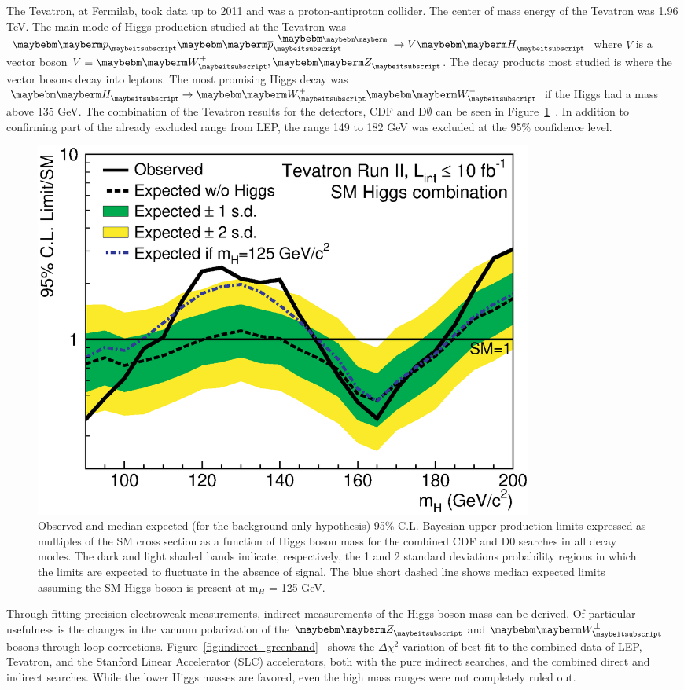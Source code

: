 The Tevatron, at Fermilab, took data up to 2011 and was a proton-antiproton collider.  The center of mass energy of the Tevatron was 1.96 TeV.  The main mode of Higgs production studied at the Tevatron was $\Pp\Pap \rightarrow V\PH$ where $V$ is a vector boson $V\equiv \PWpm,\PZ$.  The decay products most studied is where the vector bosons decay into leptons.  The most promising Higgs decay was $\PH \rightarrow \PWp\PWm$ if the Higgs had a mass above 135 GeV.  The combination of the Tevatron results for the detectors, CDF and D$\emptyset$ can be seen in Figure~\ref{fig:comboRatio}~\cite{CDFandD0:2011aa}. In addition to confirming part of the already excluded range from LEP, the range 149 to 182 GeV was excluded at the 95\% confidence level.

\begin{figure}[htb]
\centering
\includegraphics[width=0.8\textwidth]{StandardModel/tevsmlimits_feb2013.eps}
\caption{\small
Observed and median expected (for the background-only hypothesis) 95\% C.L. Bayesian upper production limits expressed as multiples of the SM cross section as a function of Higgs boson mass for the combined CDF and D0 searches in all decay modes. The dark and light shaded bands indicate, respectively, the 1 and 2 standard deviations probability regions in which the limits are expected to fluctuate in the absence of signal. The blue short dashed line shows median expected limits assuming the SM Higgs boson is present at m$_H$ = 125 GeV.~\cite{CDFandD0:2011aa}
}
\label{fig:comboRatio}
\end{figure}


Through fitting precision electroweak measurements, indirect measurements of the Higgs boson mass can be derived. Of particular usefulness is the changes in the vacuum polarization of the $\PZ$ and $\PWpm$ bosons through loop corrections. Figure~\ref{fig:indirect_greenband}~\cite{Flacher:2008zq} shows the $\Delta\chi^2$ variation of best fit to the combined data of LEP, Tevatron, and the Stanford Linear Accelerator (SLC) accelerators, both with the pure indirect searches, and the combined direct and indirect searches.  While the lower Higgs masses are favored, even the high mass ranges were not completely ruled out.

